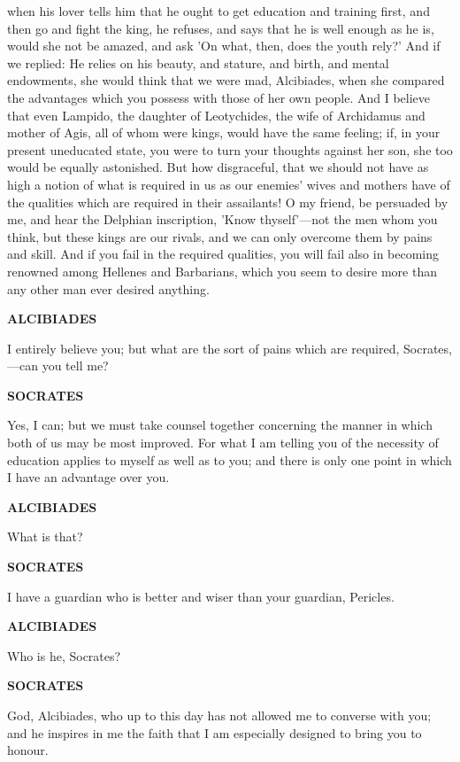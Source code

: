\documentclass[11pt,letter]{article}
\begin{document}
when his lover tells him that he ought to get education and training first, and then go and fight the king, he refuses, and says that he is well enough as he is, would she not be amazed, and ask 'On what, then, does the youth rely?' And if we replied:  He relies on his beauty, and stature, and birth, and mental endowments, she would think that we were mad, Alcibiades, when she compared the advantages which you possess with those of her own people. And I believe that even Lampido, the daughter of Leotychides, the wife of Archidamus and mother of Agis, all of whom were kings, would have the same feeling; if, in your present uneducated state, you were to turn your thoughts against her son, she too would be equally astonished. But how disgraceful, that we should not have as high a notion of what is required in us as our enemies' wives and mothers have of the qualities which are required in their assailants! O my friend, be persuaded by me, and hear the Delphian inscription, 'Know thyself'—not the men whom you think, but these kings are our rivals, and we can only overcome them by pains and skill. And if you fail in the required qualities, you will fail also in becoming renowned among Hellenes and Barbarians, which you seem to desire more than any other man ever desired anything.

\par \textbf{ALCIBIADES}
\par   I entirely believe you; but what are the sort of pains which are required, Socrates,—can you tell me?

\par \textbf{SOCRATES}
\par   Yes, I can; but we must take counsel together concerning the manner in which both of us may be most improved. For what I am telling you of the necessity of education applies to myself as well as to you; and there is only one point in which I have an advantage over you.

\par \textbf{ALCIBIADES}
\par   What is that?

\par \textbf{SOCRATES}
\par   I have a guardian who is better and wiser than your guardian, Pericles.

\par \textbf{ALCIBIADES}
\par   Who is he, Socrates?

\par \textbf{SOCRATES}
\par   God, Alcibiades, who up to this day has not allowed me to converse with you; and he inspires in me the faith that I am especially designed to bring you to honour.
\end{document}
